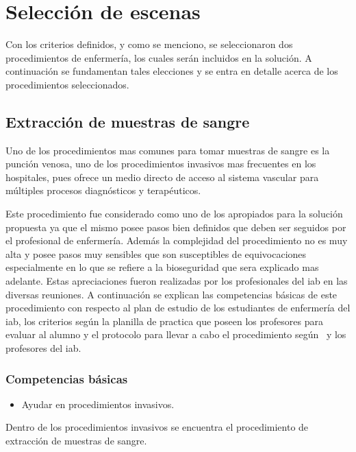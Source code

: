 \section{Selección de escenas}
\label{sec:seleccion_escenas}

Con los criterios definidos, y como se menciono, se seleccionaron dos
procedimientos de enfermería, los cuales serán incluidos en la solución. A
continuación se fundamentan tales elecciones y se entra en detalle acerca de los
procedimientos seleccionados.

\subsection{Extracción de muestras de sangre}
\label{sec:hemocultivo}

Uno de los procedimientos mas comunes para tomar muestras de sangre es la
punción venosa, uno de los procedimientos invasivos mas frecuentes en los
hospitales, pues ofrece un medio directo de acceso al sistema vascular para
múltiples procesos diagnósticos y terapéuticos.

Este procedimiento fue considerado como uno de los apropiados para la solución
propuesta ya que el mismo posee pasos bien definidos que deben ser seguidos por
el profesional de enfermería. Además la complejidad del procedimiento no es muy
alta y posee pasos muy sensibles que son susceptibles de equivocaciones
especialmente en lo que se refiere a la bioseguridad que sera explicado mas
adelante. Estas apreciaciones fueron realizadas por los profesionales del
\Gls{iab} en las diversas reuniones. A continuación se explican las competencias
básicas de este procedimiento con respecto al plan de estudio de los estudiantes
de enfermería del \Gls{iab}, los criterios según la planilla de practica que
poseen los profesores para evaluar al alumno y el protocolo para llevar a cabo
el procedimiento según~\cite{oms:extraccion} y los profesores del \Gls{iab}.

\subsubsection{Competencias básicas}
\begin{itemize}
\item Ayudar en procedimientos invasivos.
\end{itemize}

Dentro de los procedimientos invasivos se encuentra el procedimiento de
extracción de muestras de sangre.

